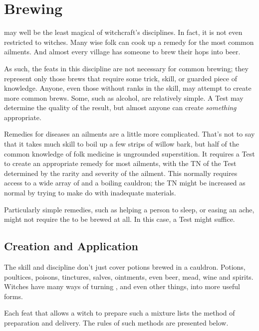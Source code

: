 \chapter{Brewing}

 may well be the least magical of witchcraft's disciplines.
In fact, it is not even restricted to witches.
Many wise folk can cook up a remedy for the most common ailments.
And almost every village has someone to brew their hops into beer.

As such, the feats in this discipline are not necessary for common brewing; they represent only those brews that require some trick, skill, or guarded piece of knowledge.
Anyone, even those without ranks in the  skill, may attempt to create more common brews.
Some, such as alcohol, are relatively simple.
A Test may determine the quality of the result, but almost anyone can create \emph{something} appropriate.

Remedies for diseases an ailments are a little more complicated.
That's not to say that it takes much skill to boil up a few strips of willow bark, but half of the common knowledge of folk medicine is ungrounded superstition.
It requires a  Test to create an appropriate remedy for most ailments, with the TN of the Test determined by the rarity and severity of the ailment.
This normally requires access to a wide array of  and a boiling cauldron; the TN might be increased as normal by trying to make do with inadequate materials.

Particularly simple remedies, such as helping a person to sleep, or easing an ache, might not require the  to be brewed at all.
In this case, a  Test might suffice.

\section{Creation and Application}

The  skill and  discipline don't just cover potions brewed in a cauldron.
Potions, poultices, poisons, tinctures, salves, ointments, even beer, mead, wine and spirits.
Witches have many ways of turning , and even other things, into more useful forms.

Each feat that allows a witch to prepare such a mixture lists the method of preparation and delivery.
The rules of such methods are presented below.

